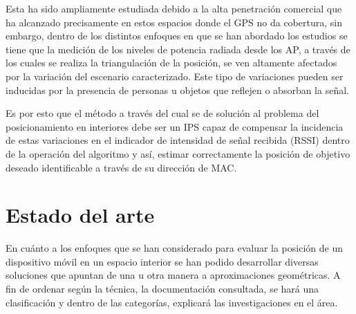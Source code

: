 Esta ha sido ampliamente estudiada debido a la alta penetración comercial que ha alcanzado precisamente en estos espacios donde el GPS no da cobertura, sin embargo, dentro de los distintos enfoques en que se han abordado los estudios se tiene que la medición de los niveles de potencia radiada desde los \ac{AP}, a través de los cuales se realiza la triangulación de la posición, se ven altamente afectados por la variación del escenario caracterizado. Este tipo de variaciones pueden ser inducidas por la presencia de personas u objetos que reflejen o absorban la señal.

Es por esto que el método a través del cual se de solución al problema del posicionamiento en interiores debe ser un \ac{IPS} capaz de compensar la incidencia de estas variaciones en el indicador de intensidad de señal recibida (RSSI) dentro de la operación del algoritmo y así, estimar correctamente la posición de objetivo deseado identificable a través de su dirección de \ac{MAC}.

\section{Estado del arte}

En cuánto a los enfoques que se han considerado para evaluar la posición de un dispositivo móvil en un espacio interior se han podido desarrollar diversas soluciones que apuntan de una u otra manera a aproximaciones geométricas. A fin de ordenar según la técnica, la documentación consultada, se hará una clasificación y dentro de las categorías, explicará las investigaciones en el área.\\

                \clearpage 


